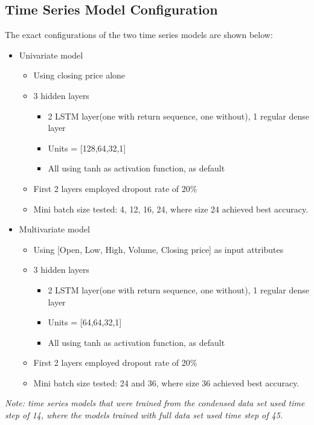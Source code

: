 \documentclass{article}
\begin{document}
\subsection{Time Series Model Configuration}
The exact configurations of the two time series models are shown below:
	\begin{itemize}
		\item Univariate model
			\begin{itemize}
				\item Using closing price alone
				\item 3 hidden layers
					\begin{itemize}
						\item  2 LSTM layer(one with return sequence, one without), 1 regular dense layer
						\item Units = [128,64,32,1]
						\item All using tanh as activation function, as default
					\end{itemize}
				\item First 2 layers employed dropout rate of 20\%
				\item Mini batch size tested: 4, 12, 16, 24, where size 24 achieved best accuracy.
			\end{itemize}
		\item Multivariate model
			\begin{itemize}
				\item Using [Open, Low, High, Volume, Closing price] as input attributes
				\item 3 hidden layers
					\begin{itemize}
						\item  2 LSTM layer(one with return sequence, one without), 1 regular dense layer
						\item Units = [64,64,32,1]
						\item All using tanh as activation function, as default
					\end{itemize}
				\item First 2 layers employed dropout rate of 20\%
				\item Mini batch size tested: 24 and 36, where size 36 achieved best accuracy.
			\end{itemize}
	\end{itemize}
\textit{Note: time series models that were trained from the condensed data set used time step of 14, where the models trained with full data set used time step of 45.}
\end{document}
